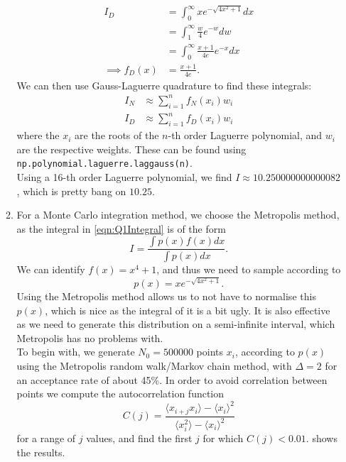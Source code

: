 \documentclass[11pt]{article}
\begin{document}
\begin{enumerate}
\begin{enumerate}
        \begin{align}
            I_D &= \int_0^\infty xe^{-\sqrt{4x^2 +1}}dx \nonumber\\
            &=\int_1^\infty \frac{w}{4}e^{-w} dw \nonumber\\
            &=\int_0^\infty \frac{x+1}{4e}e^{-x} dx \label{eqn:q1iDenominator}\\
            \implies f_D(x) &= \frac{x+1}{4e}. \label{eqn:q1iFD}
        \end{align}
        We can then use Gauss-Laguerre quadrature to find these integrals:
        \begin{align}
            I_N &\approx \sum_{i=1}^n f_N(x_i)w_i \label{eqn:GLNumerator}\\
            I_D &\approx \sum_{i=1}^n f_D(x_i)w_i \label{eqn:GLDenominator}
        \end{align}
        where the $x_i$ are the roots of the $n$-th order Laguerre polynomial, and $w_i$ are the respective weights. These can be found using \texttt{np.polynomial.laguerre.laggauss(n)}.\\
        Using a 16-th order Laguerre polynomial, we find $I \approx 10.250000000000082$, which is pretty bang on $10.25$.

        \item For a Monte Carlo integration method, we choose the Metropolis method, as the integral in \cref{eqn:Q1Integral} is of the form
        \begin{equation}
            I = \frac{\int p(x)f(x)dx}{\int p(x)dx}.
            \label{eqn:MetropolisGeneralForm}
        \end{equation}
        We can identify $f(x)=x^4+1$, and thus we need to sample according to 
        \begin{equation}
            p(x) = xe^{-\sqrt{4x^2 +1}}.
            \label{eqn:q1iiProbDist}
        \end{equation}
        Using the Metropolis method allows us to not have to normalise this $p(x)$, which is nice as the integral of it is a bit ugly. It is also effective as we need to generate this distribution on a semi-infinite interval, which Metropolis has no problems with.\\
        
        To begin with, we generate $N_0=\num[]{500000}$ points $x_i$, according to $p(x)$ using the Metropolis random walk/Markov chain method, with $\Delta=2$ for an acceptance rate of about 45\%. In order to avoid correlation between points we compute the autocorrelation function 
        \begin{equation}
            C(j) = \frac{\langle x_{i+j}x_i\rangle - \langle x_i \rangle^2}{\langle x_i^2 \rangle - \langle x_i \rangle^2}
            \label{eqn:Autocorrelation}
        \end{equation}
        for a range of $j$ values, and find the first $j$ for which $C(j)< 0.01$.  shows the results.


\end{enumerate}
\end{enumerate}
\end{document}
